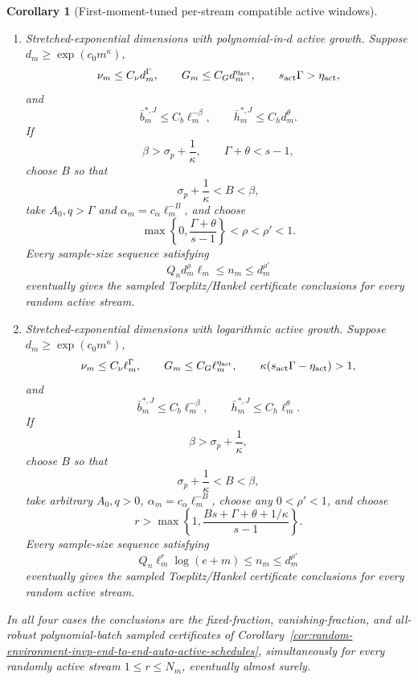 \documentclass[11pt]{amsart}
\numberwithin{equation}{section}
\newtheorem{corollary}[theorem]{Corollary}
\theoremstyle{definition}
\theoremstyle{remark}
\begin{document}
\begin{corollary}[First-moment-tuned per-stream compatible active windows]
\begin{enumerate}[label=\textup{(\roman*)},leftmargin=2.2em]
\item Stretched-exponential dimensions with polynomial-in-\(d\) active growth.
Suppose \(d_m\ge\exp(c_0m^\kappa)\),
\[
  \nu_m\le C_\nu d_m^\Gamma,\qquad
  G_m\le C_G d_m^{\eta_{\rm act}},\qquad
  s_{\rm act}\Gamma>\eta_{\rm act},
\]
and
\[
  \bar b_m^{*,J}\le C_b \ell_m^{-\beta},\qquad
  \bar h_m^{*,J}\le C_h d_m^\theta .
\]
If
\[
  \beta>\sigma_p+\frac1\kappa,\qquad \Gamma+\theta<s-1,
\]
choose \(B\) so that
\[
  \sigma_p+\frac1\kappa<B<\beta,
\]
take \(A_0,q>\Gamma\) and \(\alpha_m=c_\alpha\ell_m^{-B}\), and choose
\[
  \max\left\{0,\frac{\Gamma+\theta}{s-1}\right\}<\rho<\rho'<1 .
\]
Every sample-size sequence satisfying
\[
  Q_n d_m^\rho\ell_m\le n_m\le d_m^{\rho'}
\]
eventually gives the sampled Toeplitz/Hankel certificate conclusions for every
random active stream.

\item Stretched-exponential dimensions with logarithmic active growth.  Suppose
\(d_m\ge\exp(c_0m^\kappa)\),
\[
  \nu_m\le C_\nu\ell_m^\Gamma,\qquad
  G_m\le C_G\ell_m^{\eta_{\rm act}},\qquad
  \kappa(s_{\rm act}\Gamma-\eta_{\rm act})>1,
\]
and
\[
  \bar b_m^{*,J}\le C_b \ell_m^{-\beta},\qquad
  \bar h_m^{*,J}\le C_h \ell_m^\theta .
\]
If
\[
  \beta>\sigma_p+\frac1\kappa,
\]
choose \(B\) so that
\[
  \sigma_p+\frac1\kappa<B<\beta,
\]
take arbitrary \(A_0,q>0\), \(\alpha_m=c_\alpha\ell_m^{-B}\), choose any
\(0<\rho'<1\), and choose
\[
  r>\max\left\{1,\frac{Bs+\Gamma+\theta+1/\kappa}{s-1}\right\}.
\]
Every sample-size sequence satisfying
\[
  Q_n\ell_m^r\log(e+m)\le n_m\le d_m^{\rho'}
\]
eventually gives the sampled Toeplitz/Hankel certificate conclusions for every
random active stream.
\end{enumerate}
In all four cases the conclusions are the fixed-fraction, vanishing-fraction,
and all-robust polynomial-batch sampled certificates of
Corollary~\ref{cor:random-environment-invp-end-to-end-auto-active-schedules},
simultaneously for every randomly active stream \(1\le r\le N_m\), eventually
almost surely.
\end{corollary}
\end{document}
